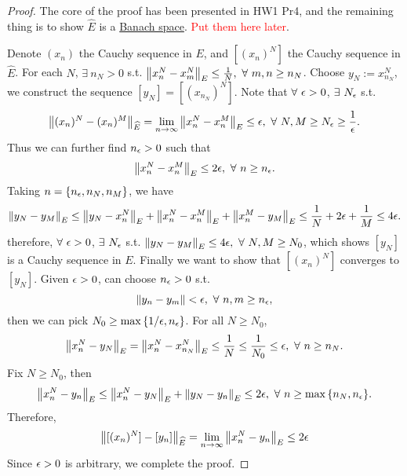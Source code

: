 \begin{proof}
The core of the proof has been presented in HW1 Pr4, and the remaining thing is to show $\hat{E}$ is a \underline{Banach space}. \textcolor{red}{Put them here later}.

\np Denote $(x_n)$ the Cauchy sequence in $E$, and $[(x_n)^N]$ the Cauchy sequence in $\hat{E}$. For each $N$, $\exists\ n_N > 0$ s.t. $\norm{x_n^N - x_m^N}_E \leq \frac{1}{N},\ \forall\ m,n \geq n_N$. Choose $y_N := x_{n_N}^N$, we construct the sequence $[y_N] = [(x_{n_N})^N]$. Note that $\forall\ \epsilon > 0$, $\exists\ N_\epsilon$ s.t.
\begin{equation*}
    \norm{(x_n)^N - (x_n)^M}_{\widehat{E}} = \lim_{n \to \infty} \norm{x_n^N - x_n^M}_E  \leq \epsilon,\ \forall\ N,M \geq N_\epsilon \geq \frac{1}{\epsilon}.
\end{equation*}
Thus we can further find $n_\epsilon > 0$ such that
\begin{equation*}
    \norm{x_n^N - x_n^M}_E \leq 2 \epsilon,\ \forall\ n \geq n_\epsilon.
\end{equation*}
Taking $n = \{n_\epsilon,n_N,n_M\}$, we have
\begin{equation*}
    \norm{y_N - y_M}_E \leq \norm{y_N - x_n^N}_E + \norm{x_n^N - x_n^M}_E + \norm{x_n^M - y_M}_E \leq\frac{1}{N} + 2\epsilon  + \frac{1}{M} \leq  4\epsilon.
\end{equation*}
therefore, $\forall\ \epsilon > 0$, $\exists\ N_\epsilon$ s.t. $\norm{y_N - y_M}_E \leq 4\epsilon,\ \forall\ N,M \geq N_0$, which shows $[y_N]$ is a Cauchy sequence in $E$. Finally we want to show that $[(x_n)^N]$ converges to $[y_N]$. Given $\epsilon > 0$, can choose $n_\epsilon > 0$ s.t.
\begin{equation*}
    \norm{y_n - y_m} < \epsilon,\ \forall\ n,m \geq n_\epsilon,
\end{equation*}
then we can pick $N_0 \geq \max{\{1/\epsilon, n_\epsilon\}}$. For all $N \geq N_0$,
\begin{equation*}
    \norm{x_n^N - y_N}_E = \norm{x_n^N - x_{n_N}^N}_E \leq \frac{1}{N} \leq \frac{1}{N_0} \leq \epsilon,\ \forall\ n \geq n_N. 
\end{equation*}
Fix $N \geq N_0$, then
\begin{equation*}
    \norm{x_n^N - y_n}_E \leq \norm{x_n^N - y_N}_E + \norm{y_N - y_n}_E \leq 2\epsilon,\ \forall\ n \geq \max{\{n_N,n_\epsilon\}}.
\end{equation*}
Therefore,
\begin{equation*}
    \norm{[(x_n)^N] - [y_n]}_{\widehat{E}} = \lim_{n \to \infty} \norm{x_n^N - y_n}_E \leq 2\epsilon
\end{equation*}
Since $\epsilon > 0$ is arbitrary, we complete the proof.
\end{proof}


